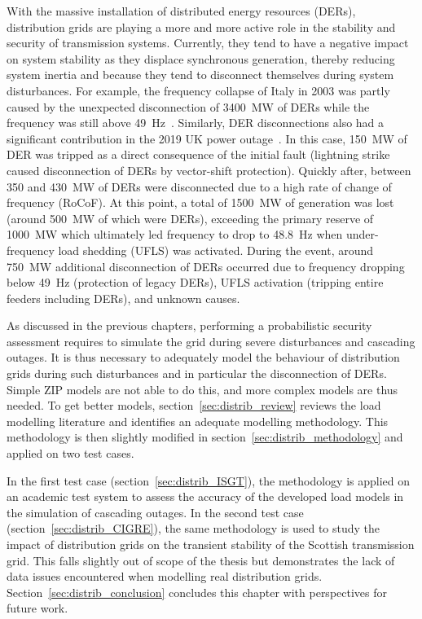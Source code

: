With the massive installation of distributed energy resources (DERs), distribution grids are playing a more and more active role in the stability and security of transmission systems. Currently, they tend to have a negative impact on system stability as they displace synchronous generation, thereby reducing system inertia and because they tend to disconnect themselves during system disturbances. For example, the frequency collapse of Italy in 2003 was partly caused by the unexpected disconnection of 3400~MW of DERs while the frequency was still above 49~Hz~\cite[p115]{Italy2003}. Similarly, DER disconnections also had a significant contribution in the 2019 UK power outage~\cite{2019UKBlackout}. In this case, 150~MW of DER was tripped as a direct consequence of the initial fault (lightning strike caused disconnection of DERs by vector-shift protection). Quickly after, between 350 and 430~MW of DERs were disconnected due to a high rate of change of frequency (RoCoF). At this point, a total of 1500~MW of generation was lost (around 500~MW of which were DERs), exceeding the primary reserve of 1000~MW which ultimately led frequency to drop to 48.8~Hz when under-frequency load shedding (UFLS) was activated. During the event, around 750~MW additional disconnection of DERs occurred due to frequency dropping below 49~Hz (protection of legacy DERs), UFLS activation (tripping entire feeders including DERs), and unknown causes. %

As discussed in the previous chapters, performing a probabilistic security assessment requires to simulate the grid during severe disturbances and cascading outages. It is thus necessary to adequately model the behaviour of distribution grids during such disturbances and in particular the disconnection of DERs. Simple ZIP models are not able to do this, and more complex models are thus needed. To get better models, section~\ref{sec:distrib_review} reviews the load modelling literature and identifies an adequate modelling methodology. This methodology is then slightly modified in section~\ref{sec:distrib_methodology} and applied on two test cases.

In the first test case (section~\ref{sec:distrib_ISGT}), the methodology is applied on an academic test system to assess the accuracy of the developed load models in the simulation of cascading outages. In the second test case (section~\ref{sec:distrib_CIGRE}), the same methodology is used to study the impact of distribution grids on the transient stability of the Scottish transmission grid. This falls slightly out of scope of the thesis but demonstrates the lack of data issues encountered when modelling real distribution grids. Section~\ref{sec:distrib_conclusion} concludes this chapter with perspectives for future work.


